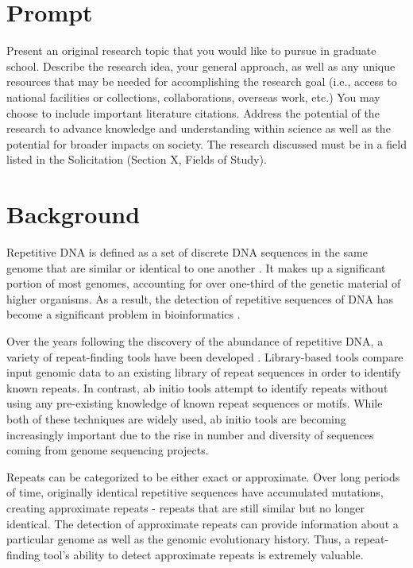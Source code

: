 \documentclass[12pt]{article}
\begin{document}
\section*{Prompt}Present an original research topic that you would like to pursue in graduate school. Describe the research idea, your general approach, as well as any unique resources that may be needed for accomplishing the research goal (i.e., access to national facilities or collections, collaborations, overseas work, etc.) You may choose to include important literature citations. Address the potential of the research to advance knowledge and understanding within science as well as the potential for broader impacts on society. The research discussed must be in a field listed in the Solicitation (Section X, Fields of Study).
\clearpage


\section*{Background}

Repetitive DNA is defined as a set of discrete DNA sequences in the same genome that are similar or identical to one another \cite{britten1968repeated}. It makes up a significant portion of most genomes, accounting for over one-third of the genetic material of higher organisms. As a result, the detection of repetitive sequences of DNA has become a significant problem in bioinformatics \cite{pevzner2004de-novo}.

Over the years following the discovery of the abundance of repetitive DNA, a variety of repeat-finding tools have been developed \cite{saha2008computational}. Library-based tools compare input genomic data to an existing library of repeat sequences in order to identify known repeats. In contrast, ab initio tools attempt to identify repeats without using any pre-existing knowledge of known repeat sequences or motifs. While both of these techniques are widely used, ab initio tools are becoming increasingly important due to the rise in number and diversity of sequences coming from genome sequencing projects. 

Repeats can be categorized to be either exact or approximate. Over long periods of time, originally identical repetitive sequences have accumulated mutations, creating approximate repeats - repeats that are still similar but no longer identical. The detection of approximate repeats can provide information about a particular genome as well as the genomic evolutionary history. Thus, a repeat-finding tool's ability to detect approximate repeats is extremely valuable.
\end{document}
